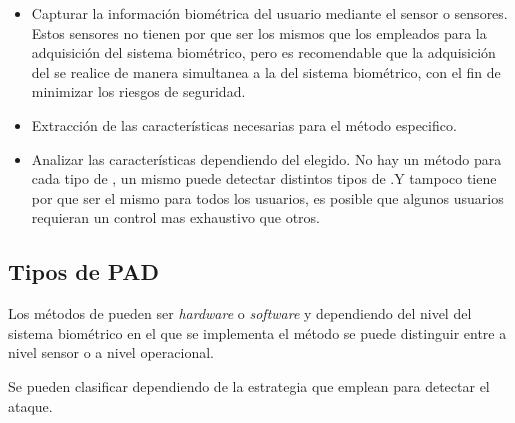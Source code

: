 \begin{itemize}
    \item
    Capturar la información biométrica del usuario mediante el sensor o sensores. Estos sensores no tienen por que ser los mismos que los empleados para la adquisición del sistema biométrico, pero es recomendable que la adquisición del  se realice de manera simultanea a la del sistema biométrico, con el fin de minimizar los riesgos de seguridad.
    
    \item
    Extracción de las características necesarias para el método  especifico. 
    
    \item
    Analizar las características dependiendo del  elegido. No hay un método  para cada tipo de , un mismo  puede detectar distintos tipos de .Y tampoco tiene por que ser el mismo para todos los usuarios, es posible que algunos usuarios requieran un control mas exhaustivo que otros. 
\end{itemize}


\subsection{Tipos de PAD}\label{sec:TiposPAD}

Los métodos de  pueden ser \textit{hardware} o \textit{software} y dependiendo del nivel del sistema biométrico en el que se implementa el método se puede distinguir entre  a nivel sensor o  a nivel operacional.

Se pueden clasificar dependiendo de la estrategia que emplean para detectar el ataque.


